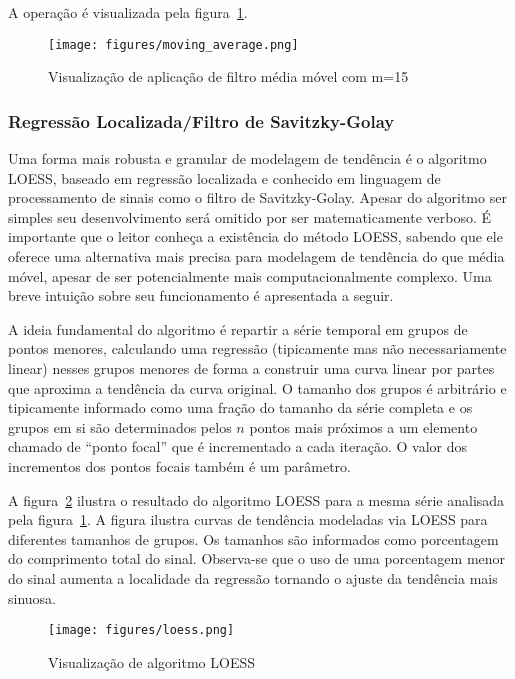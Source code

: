 A operação é visualizada pela figura~\ref{fig:MA}.

\begin{figure}[H]
    \centering
    \texttt{[image: figures/moving\_average.png]}
    \caption{Visualização de aplicação de filtro média móvel com m=15}
    \label{fig:MA}
\end{figure}


\subsubsection{Regressão Localizada/Filtro de Savitzky-Golay}

Uma forma mais robusta e granular de modelagem de tendência é o algoritmo
LOESS, baseado em regressão localizada e conhecido em linguagem de processamento
de sinais como o filtro de Savitzky-Golay. Apesar do algoritmo ser simples
seu desenvolvimento será omitido por ser matematicamente verboso. É importante
que o leitor conheça a existência do método LOESS, sabendo que ele oferece uma
alternativa mais precisa para modelagem de tendência do que média móvel,
apesar de ser potencialmente mais computacionalmente complexo. Uma breve
intuição sobre seu funcionamento é apresentada a seguir.

A ideia fundamental do algoritmo é repartir a série temporal em grupos de
pontos menores, calculando uma regressão (tipicamente mas não necessariamente
linear) nesses grupos menores de forma a construir uma curva linear por partes
que aproxima a tendência da curva original. O tamanho dos grupos é arbitrário
e tipicamente informado como uma fração do tamanho da série completa e os grupos
em si são determinados pelos $n$ pontos mais próximos a um elemento chamado de
``ponto focal'' que é incrementado a cada iteração. O valor dos incrementos dos
pontos focais também é um parâmetro.

A figura~\ref{fig:loess} ilustra o resultado do algoritmo LOESS para a mesma
série analisada pela figura~\ref{fig:MA}. A figura ilustra curvas de tendência
modeladas via LOESS para diferentes tamanhos de grupos. Os tamanhos são
informados como porcentagem do comprimento total do sinal. Observa-se que o uso
de uma porcentagem menor do sinal aumenta a localidade da regressão tornando o
ajuste da tendência mais sinuosa.

\begin{figure}[H]
    \centering
    \texttt{[image: figures/loess.png]}
    \caption{Visualização de algoritmo LOESS}
    \label{fig:loess}
\end{figure}

